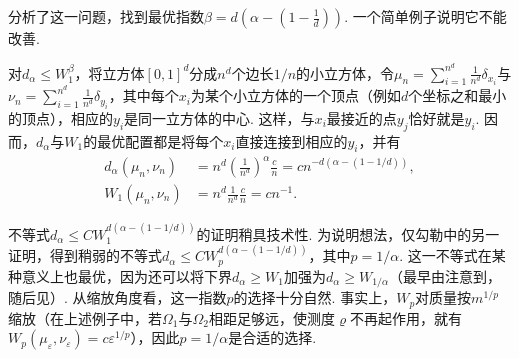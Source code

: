 \cite{b240}分析了这一问题，找到最优指数$\beta=d(\alpha-(1-\frac1d))$. 一个简单例子说明它不能改善.

\begin{example}[最优指数]\label{obj:5.35}
对$d_\alpha\le W_1^\beta$，将立方体$[0,1]^d$分成$n^d$个边长$1/n$的小立方体，令$\mu_n=\sum_{i=1}^{n^d}\frac1{n^d}\delta_{x_i}$与$\nu_n=\sum_{i=1}^{n^d}\frac1{n^d}\delta_{y_i}$，其中每个$x_i$为某个小立方体的一个顶点（例如$d$个坐标之和最小的顶点），相应的$y_i$是同一立方体的中心. 这样，与$x_i$最接近的点$y_j$恰好就是$y_i$. 因而，$d_\alpha$与$W_1$的最优配置都是将每个$x_i$直接连接到相应的$y_i$，并有
\[
\begin{aligned}
d_\alpha(\mu_n,\nu_n)&=n^d\left(\frac1{n^d}\right)^\alpha\frac cn
=cn^{-d(\alpha-(1-1/d))},\\
W_1(\mu_n,\nu_n)&=n^d\frac1{n^d}\frac cn=cn^{-1}.
\end{aligned}
\]
\end{example}

不等式$d_\alpha\le CW_1^{d(\alpha-(1-1/d))}$的证明稍具技术性. 为说明想法，仅勾勒\cite{b81}中的另一证明，得到稍弱的不等式$d_\alpha\le CW_p^{d(\alpha-(1-1/d))}$，其中$p=1/\alpha$. 这一不等式在某种意义上也最优，因为还可以将下界$d_\alpha\ge W_1$加强为$d_\alpha\ge W_{1/\alpha}$（最早由\cite{b220}注意到，随后见\cite{b81}）. 从缩放角度看，这一指数$p$的选择十分自然. 事实上，$W_p$对质量按$m^{1/p}$缩放（在上述例子中，若$\Omega_1$与$\Omega_2$相距足够远，使测度$\varrho$不再起作用，就有$W_p(\mu_\varepsilon,\nu_\varepsilon)=c\varepsilon^{1/p}$），因此$p=1/\alpha$是合适的选择.


